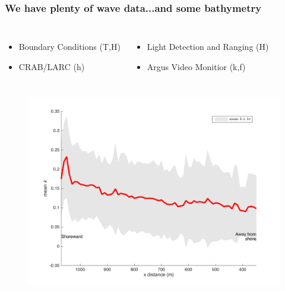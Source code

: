 \documentclass[7pt]{beamer}
\begin{document}
\begin{frame}
\frametitle{We have plenty of wave data...and some bathymetry}
\begin{columns}
\begin{itemize}
\item Boundary Conditions (T,H)
\item CRAB/LARC (h)

\end{itemize}
\begin{itemize}
\item Light Detection and Ranging (H)
\item Argus Video Monitior (k,f)
\end{itemize}
\end{columns}

\begin{figure}[H]
\centering
\includegraphics[width=.7\linewidth]{img/k1Dmean_std.png}

\end{figure}
\end{frame}


\end{document}
